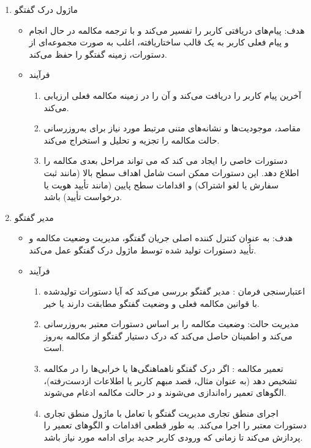 \begin{enumerate}
\item
ماژول درک گفتگو
\begin{itemize}
\item
هدف: پیام‌های دریافتی کاربر را تفسیر می‌کند و با ترجمه مکالمه در حال انجام و پیام فعلی کاربر به یک قالب ساختاریافته، اغلب به صورت مجموعه‌ای از دستورات، زمینه‌ گفتگو را حفظ می‌کند.
\item
فرآیند
\begin{enumerate}
\item
آخرین پیام کاربر را دریافت می‌کند و آن را در زمینه مکالمه فعلی ارزیابی می‌کند.
\item
مقاصد، موجودیت‌ها و نشانه‌های متنی مرتبط مورد نیاز برای به‌روزرسانی حالت مکالمه را تجزیه و تحلیل و استخراج می‌کند.
\item
دستورات خاصی را ایجاد می کند که می تواند مراحل بعدی مکالمه را اطلاع دهد. این دستورات ممکن است شامل اهداف سطح بالا (مانند ثبت سفارش یا لغو اشتراک) و اقدامات سطح پایین (مانند تأیید هویت یا درخواست تأیید) باشد.
\end{enumerate}

\end{itemize}

\item
مدیر گفتگو
\begin{itemize}
\item
هدف: به عنوان کنترل کننده اصلی جریان گفتگو، مدیریت وضعیت مکالمه و تأیید دستورات تولید شده توسط ماژول 
درک گفتگو%
 عمل می‌کند.
\item
فرآیند
\begin{enumerate}
\item
اعتبارسنجی فرمان%
: مدیر گفتگو بررسی می‌کند که آیا دستورات تولید‌شده با قوانین مکالمه فعلی و وضعیت گفتگو مطابقت دارند یا خیر.
\item
مدیریت حالت: وضعیت مکالمه را بر اساس دستورات معتبر به‌روزرسانی می‌کند و اطمینان حاصل می‌کند که درک دستیار گفتگو از مکالمه به‌روز است.
\item
تعمیر مکالمه%
: اگر درک گفتگو ناهماهنگی‌ها یا خرابی‌ها را در مکالمه تشخیص دهد (به عنوان مثال، قصد مبهم کاربر یا اطلاعات ازدست‌رفته)، الگوهای تعمیر راه‌اندازی می‌شوند و در حالت مکالمه ادغام می‌شوند.

\item
اجرای منطق تجاری%
مدیریت گفتگو با تعامل با ماژول منطق تجاری دستورات معتبر را اجرا می‌کند. به طور قطعی اقدامات و الگوهای تعمیر را پردازش می‌کند تا زمانی که ورودی کاربر جدید برای ادامه مورد نیاز باشد.
\end{enumerate}


\end{itemize}
\end{enumerate}
